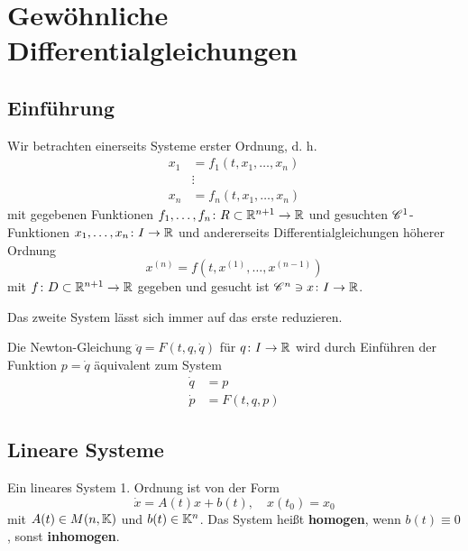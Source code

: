 \section{Gewöhnliche Differentialgleichungen}

\subsection{Einführung}
Wir betrachten einerseits Systeme erster Ordnung, d. h.
\begin{align*}
	x_1 &= f_1(t, x_1, \dots, x_n)\\
	&\vdots\\
	x_n &= f_n(t, x_1, \dots, x_n)
\end{align*}
mit gegebenen Funktionen $f_1, \dots, f_n \colon R \subset \mathbb{R}^{n+1} \to \mathbb{R}$ und gesuchten $\mathscr{C}^1$-Funktionen $x_1, \dots, x_n \colon I \to \mathbb{R}$ und andererseits Differentialgleichungen höherer Ordnung
\[x^{(n)} = f(t, x^{(1)}, \dots, x^{(n-1)})\]
mit $f \colon D \subset \mathbb{R}^{n+1} \to \mathbb{R}$ gegeben und gesucht ist $\mathscr{C}^n \ni x \colon I \to \mathbb{R}$. 

Das zweite System lässt sich immer auf das erste reduzieren.
\begin{beispiel}
	Die Newton-Gleichung $\ddot{q} = F(t, q, \dot{q})$ für $q \colon I \to \mathbb{R}$ wird durch Einführen der Funktion $p = \dot{q}$ äquivalent zum System
	\begin{align*}
		\dot{q} &= p\\
		\dot{p} &= F(t,q,p)
	\end{align*}
\end{beispiel}
\subsection{Lineare Systeme}
Ein lineares System 1. Ordnung ist von der Form
\begin{equation}\label{eq:5_2_eq0}
	\dot{x} = A(t)x + b(t), \quad x(t_0) = x_0
\end{equation}
mit $A(t) \in M(n, \mathbb{K})$ und $b(t) \in \mathbb{K}^n$. Das System heißt \textbf{homogen}, wenn $b(t) \equiv 0$, sonst \textbf{inhomogen}.

